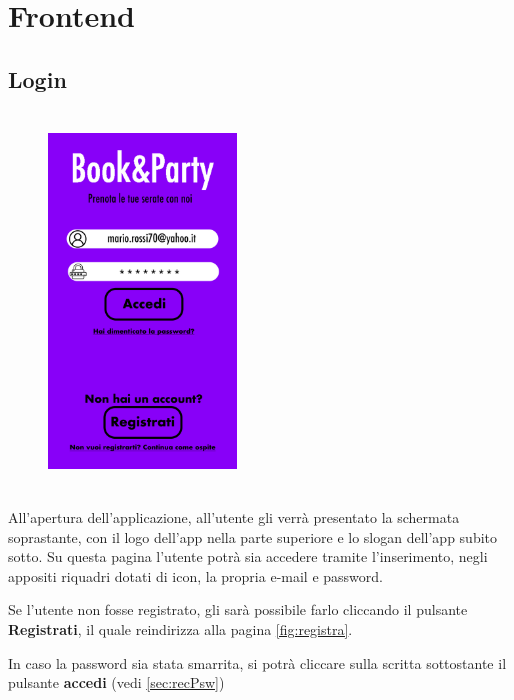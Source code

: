 \chapter{Frontend}

\section{Login}
\begin{figure}[h]
    \centering
    \includegraphics[width=5cm, height=10cm]{mockup/01-login.jpg}
    \label{fig:login}
\end{figure}

All'apertura dell'applicazione, all'utente gli verrà presentato la schermata soprastante, con 
il logo dell'app nella parte superiore e lo slogan dell'app subito sotto. Su questa pagina
l'utente potrà sia accedere tramite l'inserimento, negli appositi riquadri dotati di icon, 
la propria e-mail e password. 
 
Se l'utente non fosse registrato, gli sarà possibile farlo
cliccando il pulsante \textbf{Registrati}, il quale reindirizza alla pagina \ref{fig:registra}. 
 
In caso la password sia stata smarrita, si potrà cliccare sulla scritta sottostante il 
pulsante \textbf{accedi} (vedi \ref{sec:recPsw})

